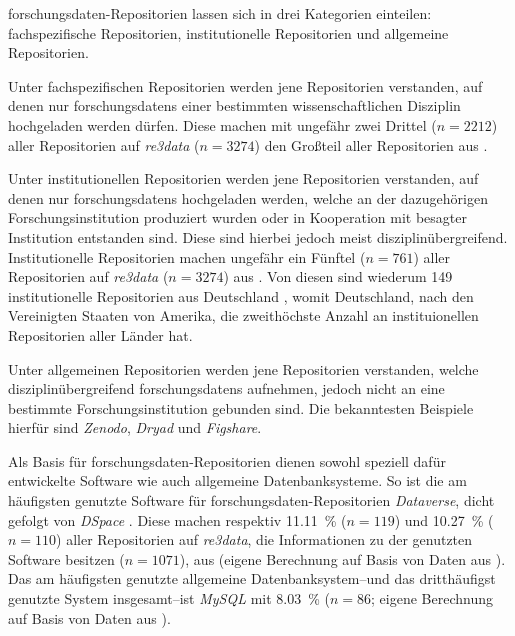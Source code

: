 \gls{forschungsdaten}-Repositorien lassen sich in drei Kategorien einteilen:
fachspezifische Repositorien, institutionelle Repositorien und allgemeine Repositorien.

Unter fachspezifischen Repositorien werden jene Repositorien verstanden, auf denen nur \glspl{forschungsdaten} einer bestimmten wissenschaftlichen Disziplin hochgeladen werden dürfen.
Diese machen mit ungefähr zwei Drittel ($n=\num{2212}$) aller Repositorien auf \textit{re3data} ($n=\num{3274}$) den Großteil aller Repositorien aus \autocite{Khan2024}.

Unter institutionellen Repositorien werden jene Repositorien verstanden, auf denen nur \glspl{forschungsdaten} hochgeladen werden, welche an der dazugehörigen Forschungsinstitution produziert wurden oder in Kooperation mit besagter Institution entstanden sind.
Diese sind hierbei jedoch meist disziplinübergreifend.
Institutionelle Repositorien machen ungefähr ein Fünftel ($n=\num{761}$) aller Repositorien auf \textit{re3data}  ($n=\num{3274}$) aus \autocite{Khan2024}.
Von diesen sind wiederum \num{149} institutionelle Repositorien aus Deutschland \autocite{re3data-institutional}, womit Deutschland, nach den Vereinigten Staaten von Amerika, die zweithöchste Anzahl an instituionellen Repositorien aller Länder hat.

Unter allgemeinen Repositorien werden jene Repositorien verstanden, welche disziplinübergreifend \glspl{forschungsdaten} aufnehmen, jedoch nicht an eine bestimmte Forschungsinstitution gebunden sind.
Die bekanntesten Beispiele hierfür sind \textit{Zenodo}, \textit{Dryad} und \textit{Figshare}.

Als Basis für \gls{forschungsdaten}-Repositorien dienen sowohl speziell dafür entwickelte Software wie auch allgemeine Datenbanksysteme.
So ist die am häufigsten genutzte Software für \gls{forschungsdaten}-Repositorien \textit{Dataverse}, dicht gefolgt von \textit{DSpace} \autocite{Khan2024}.
Diese machen respektiv \SI{11.11}{\percent} ($n=\num{119}$) und \SI{10.27}{\percent} ($n=\num{110}$) aller Repositorien auf \textit{re3data}, die Informationen zu der genutzten Software besitzen ($n=\num{1071}$), aus (eigene Berechnung auf Basis von Daten aus \autocite{Khan2024}).
Das am häufigsten genutzte allgemeine Datenbanksystem--und das dritthäufigst genutzte System insgesamt--ist \textit{MySQL} mit \SI{8.03}{\percent} ($n=\num{86}$; eigene Berechnung auf Basis von Daten aus \autocite{Khan2024}).

